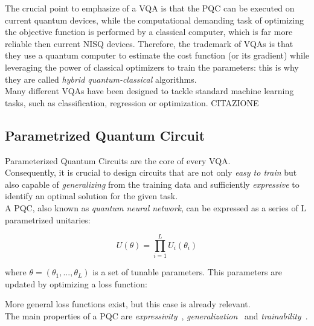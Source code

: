 The crucial point to emphasize of a VQA is that the PQC can be executed on current quantum
devices, while the computational demanding task of optimizing the objective function is
performed by a classical computer, which is far more reliable then current NISQ devices.
Therefore, the trademark of VQAs is that they use a quantum computer to estimate the cost function (or its gradient) 
while leveraging the power of classical optimizers to train the parameters: this is why they are called
\textit{hybrid quantum-classical} algorithms.\\
Many different VQAs have been designed to tackle standard machine learning tasks, such
as classification, regression or optimization.
CITAZIONE

\subsection{Parametrized Quantum Circuit}


Parameterized Quantum Circuits are the core of every VQA.\\
Consequently, it is crucial to design circuits that are not only \textit{easy to train} but also capable of 
\textit{generalizing} from the training data and sufficiently \textit{expressive} to identify an optimal solution 
for the given task.\\

A PQC, also known as \textit{quantum neural network}, can be expressed as a series of L parametrized unitaries:

\begin{equation}
    U(\theta) = \prod_{i=1}^L U_i(\theta_i)
\label{Eq:definition-PQC}
\end{equation}

where $\theta = (\theta_1, ..., \theta_L)$ is a set of tunable parameters.
This parameters are updated by optimizing a loss function:

More general loss functions exist, but this case is already relevant.\\
The main properties of a PQC are \textit{expressivity}~\cite{hubregtsen2020, Sim_2019, Bravo_Prieto_2020, 
Wu_2021, Herman_2023, Haug_2021, Holmes_2022}, \textit{generalization}~\cite{Caro_2020, Abbas_2021, Banchi_2021,
Bu_2023, bu2021, Bu_2022, Du_2022, Peters_2023, Caro_2023} and \textit{trainability}~\cite{McClean_2018, 
Cerezo_2021, Arrasmith_2021, Kim_2021, Wang_2021, Pesah_2021, marrero2021, Larocca_2023}.

